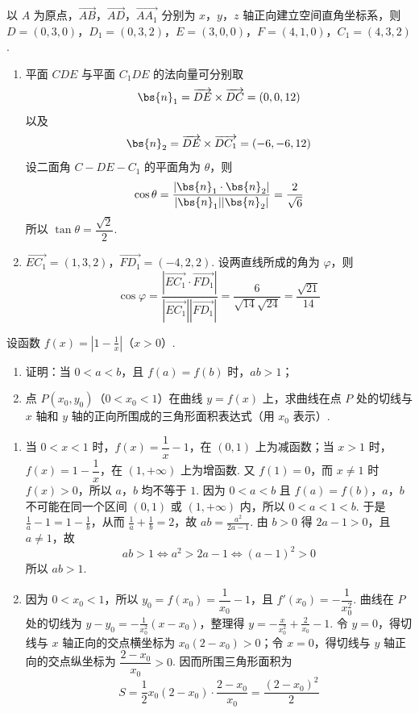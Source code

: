 \begin{solution}
以 \(A\) 为原点，\(\overrightarrow{AB}\)，\(\overrightarrow{AD}\)，\(\overrightarrow{AA_1}\) 分别为 \(x\)，\(y\)，\(z\) 轴正向建立空间直角坐标系，则
\(D=(0,3,0)\)，\(D_1=(0,3,2)\)，\(E=(3,0,0)\)，\(F=(4,1,0)\)，\(C_1=(4,3,2)\).

\begin{enumerate}
\item 平面 \(CDE\) 与平面 \(C_1DE\) 的法向量可分别取
\[
\bs{n}_1=\overrightarrow{DE}\times\overrightarrow{DC}=(0,0,12)
\]
以及
\[
\bs{n}_2=\overrightarrow{DE}\times\overrightarrow{DC_1}=(-6,-6,12)
\]
设二面角 \(C-DE-C_1\) 的平面角为 \(\theta\)，则
\[
\cos\theta=\frac{|\bs{n}_1\cdot\bs{n}_2|}{|\bs{n}_1||\bs{n}_2|}=\frac{2}{\sqrt6}
\]
所以 \(\tan\theta=\dfrac{\sqrt2}{2}\).

\item \(\overrightarrow{EC_1}=(1,3,2)\)，\(\overrightarrow{FD_1}=(-4,2,2)\). 设两直线所成的角为 \(\varphi\)，则
\[
\cos\varphi=\frac{|\overrightarrow{EC_1}\cdot\overrightarrow{FD_1}|}{|\overrightarrow{EC_1}||\overrightarrow{FD_1}|}=\frac{6}{\sqrt{14}\sqrt{24}}=\frac{\sqrt{21}}{14}
\]
\end{enumerate}
\end{solution}

\begin{problem}
设函数 \( f(x) = \left|1 - \frac{1}{x}\right| \)（\(x > 0\)）.

\begin{enumerate}
\item 证明：当 \(0 < a < b\)，且 \(f(a) = f(b)\) 时，\(ab > 1\)；
\item 点 \(P(x_0, y_0)\)（\(0 < x_0 < 1\)）在曲线 \(y = f(x)\) 上，求曲线在点 \(P\) 处的切线与 \(x\) 轴和 \(y\) 轴的正向所围成的三角形面积表达式（用 \(x_0\) 表示）.
\end{enumerate}
\end{problem}

\begin{solution}
\begin{enumerate}
\item 当 \(0<x<1\) 时，\(f(x)=\dfrac{1}{x}-1\)，在 \((0,1)\) 上为减函数；当 \(x>1\) 时，\(f(x)=1-\dfrac{1}{x}\)，在 \((1,+\infty)\) 上为增函数. 又 \(f(1)=0\)，而 \(x\ne1\) 时 \(f(x)>0\)，所以 \(a\)，\(b\) 均不等于 \(1\). 因为 \(0<a<b\) 且 \(f(a)=f(b)\)，\(a\)，\(b\) 不可能在同一个区间 \((0,1)\) 或 \((1,+\infty)\) 内，所以 \(0<a<1<b\). 于是
\(\frac{1}{a}-1=1-\frac{1}{b}\)，从而 \(\frac{1}{a}+\frac{1}{b}=2\)，故 \(ab=\frac{a^2}{2a-1}\).
由 \(b>0\) 得 \(2a-1>0\)，且 \(a\ne1\)，故
\[
ab>1\Longleftrightarrow a^2>2a-1\Longleftrightarrow (a-1)^2>0
\]
所以 \(ab>1\).

\item 因为 \(0<x_0<1\)，所以 \(y_0=f(x_0)=\dfrac{1}{x_0}-1\)，且 \(f'(x_0)=-\dfrac{1}{x_0^2}\). 曲线在 \(P\) 处的切线为 \(y-y_0=-\frac{1}{x_0^2}(x-x_0)\)，整理得 \(y=-\frac{x}{x_0^2}+\frac{2}{x_0}-1\).
令 \(y=0\)，得切线与 \(x\) 轴正向的交点横坐标为 \(x_0(2-x_0)>0\)；令 \(x=0\)，得切线与 \(y\) 轴正向的交点纵坐标为 \(\dfrac{2-x_0}{x_0}>0\). 因而所围三角形面积为
\[
S=\frac12 x_0(2-x_0)\cdot\frac{2-x_0}{x_0}=\frac{(2-x_0)^2}{2}
\]
\end{enumerate}
\end{solution}

